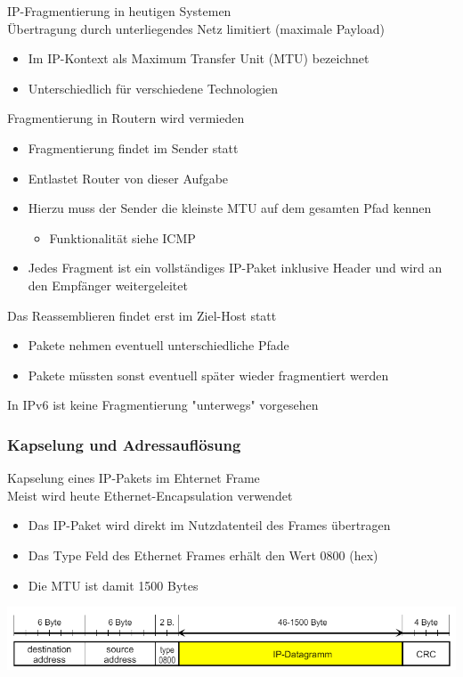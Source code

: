 \begin{concept}{IP-Fragmentierung in heutigen Systemen}\\
    Übertragung durch unterliegendes Netz limitiert (maximale Payload)
    \begin{itemize}
        \item Im IP-Kontext als Maximum Transfer Unit (MTU) bezeichnet
        \item Unterschiedlich für verschiedene Technologien
    \end{itemize}
    Fragmentierung in Routern wird vermieden
    \begin{itemize}
        \item Fragmentierung findet im Sender statt
        \item Entlastet Router von dieser Aufgabe
        \item Hierzu muss der Sender die kleinste MTU auf dem gesamten Pfad kennen
        \begin{itemize}
            \item Funktionalität siehe ICMP
        \end{itemize}
        \item Jedes Fragment ist ein vollständiges IP-Paket inklusive Header und wird an den Empfänger weitergeleitet
    \end{itemize}
    Das Reassemblieren findet erst im Ziel-Host statt
    \begin{itemize}
        \item Pakete nehmen eventuell unterschiedliche Pfade
        \item Pakete müssten sonst eventuell später wieder fragmentiert werden
    \end{itemize}
    In IPv6 ist keine Fragmentierung "unterwegs" vorgesehen
\end{concept}

\subsubsection{Kapselung und Adressauflösung}

\begin{definition}{Kapselung eines IP-Pakets im Ehternet Frame}\\
    Meist wird heute Ethernet-Encapsulation verwendet
    \begin{itemize}
        \item Das IP-Paket wird direkt im Nutzdatenteil des Frames übertragen
        \item Das Type Feld des Ethernet Frames erhält den Wert 0800 (hex)
        \item Die MTU ist damit 1500 Bytes
    \end{itemize}
        \includegraphics[width=1\linewidth]{images/kapselung_ip_paket.png}
\end{definition}

